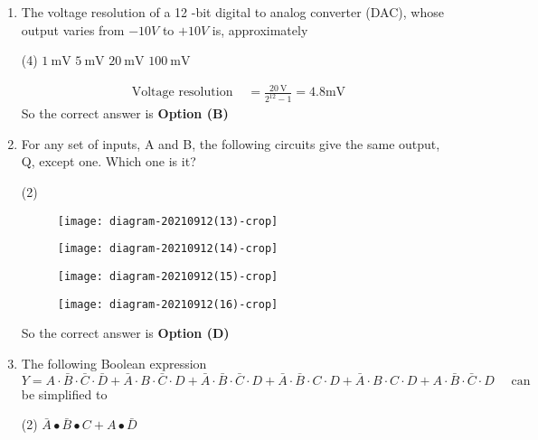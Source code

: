 \begin{enumerate}
	\item The voltage resolution of a 12 -bit digital to analog converter (DAC), whose output varies from $-10 V$ to $+10 V$ is, approximately
{	}
\begin{tasks}(4)
\task[\textbf{A.}] $1\  \mathrm{mV}$
\task[\textbf{B.}] $5 \ \mathrm{mV}$
\task[\textbf{C.}] $20 \ \mathrm{mV}$
\task[\textbf{D.}] $100 \ \mathrm{mV}$
\end{tasks}
\begin{answer}
\begin{align*}
\text{Voltage resolution }&=\frac{20 \mathrm{~V}}{2^{12}-1}=4.8 \mathrm{mV}
\end{align*}
So the correct answer is \textbf{Option (B)}
\end{answer}
	\item For any set of inputs, A and B, the following circuits give the same output, Q, except one. Which one is it?
{	}
\begin{tasks}(2)
\task[\textbf{A.}] \begin{figure}[H]
	\centering
	\texttt{[image: diagram-20210912(13)-crop]}
\end{figure}
\task[\textbf{B.}]\begin{figure}[H]
	\centering
	\texttt{[image: diagram-20210912(14)-crop]}
\end{figure}
\task[\textbf{C.}] \begin{figure}[H]
	\centering
	\texttt{[image: diagram-20210912(15)-crop]}
\end{figure}
\task[\textbf{D.}]\begin{figure}[H]
	\centering
	\texttt{[image: diagram-20210912(16)-crop]}
\end{figure}
\end{tasks}
\begin{answer}
So the correct answer is \textbf{Option (D)}
\end{answer}
\item The following Boolean expression
	$$
	Y=A \cdot \bar{B} \cdot \bar{C} \cdot \bar{D}+\bar{A} \cdot B \cdot \bar{C} \cdot D+\bar{A} \cdot \bar{B} \cdot \bar{C} \cdot D+\bar{A} \cdot \bar{B} \cdot C \cdot D+\bar{A} \cdot B \cdot C \cdot D+A \cdot \bar{B} \cdot \bar{C} \cdot D \quad \text { can }
	$$
	be simplified to
{	}
\begin{tasks}(2)
\task[\textbf{A.}] $\bar{A} \bullet \bar{B} \bullet C+A \bullet \bar{D}$

\end{tasks}
\end{enumerate}
